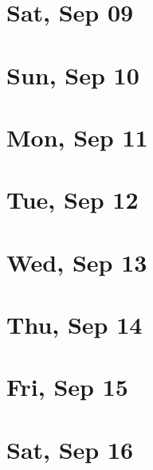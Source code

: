	\section{Sat, Sep 09}
		
		
	\section{Sun, Sep 10}
		
		
	\section{Mon, Sep 11}
		
		
	\section{Tue, Sep 12}
		
		
	\section{Wed, Sep 13}
		
		
	\section{Thu, Sep 14}
		
		
	\section{Fri, Sep 15}
		
		
	\section{Sat, Sep 16}
		
		
